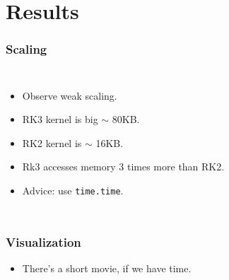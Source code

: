 \documentclass[]{beamer}
\newcommand{\coder}[1]{\texttt{#1}}
\begin{document}
\section{Results}
\begin{frame}
  \frametitle{Scaling}   %
  \begin{columns}[c]
  \column{2in}  %
  \begin{itemize}
  \item Observe weak scaling.
  \item RK3 kernel is big $\sim$ 80KB.
  \item RK2 kernel is $\sim$ 16KB.
  \item Rk3 accesses memory 3 times more than RK2.
  \item Advice: use \coder{time.time}.
  \end{itemize}
  \column{2in}
  \end{columns}
\end{frame}

\begin{frame}
  \frametitle{Visualization}   %
  \begin{itemize}
  \item There's a short movie, if we have time.  
  \end{itemize}
\end{frame}
	
\end{document}
